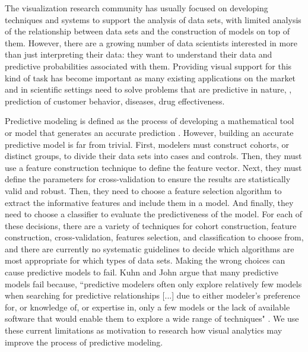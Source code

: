 The visualization research community has usually focused on developing techniques and systems to support the analysis of data sets, with limited analysis of the relationship between data sets and the construction of models on top of them. However, there are a growing number of data scientists interested in more than just interpreting their data: they want to understand their data and predictive probabilities associated with them. Providing visual support for this kind of task has become important as many existing applications on the market and in scientific settings need to solve problems that are predictive in nature, \eg, prediction of customer behavior, diseases, drug effectiveness.

Predictive modeling is defined as the process of developing a mathematical tool or model that generates an accurate prediction \cite{kuhn2013applied}. However, building an accurate predictive model is far from trivial. First, modelers must construct cohorts, or distinct groups, to divide their data sets into cases and controls. Then, they must use a feature construction technique to define the feature vector. Next, they must define the parameters for cross-validation to ensure the results are statistically valid and robust. Then, they need to choose a feature selection algorithm to extract the informative features and include them in a model. And finally, they need to choose a classifier to evaluate the predictiveness of the model. For each of these decisions, there are a variety of techniques for cohort construction, feature construction, cross-validation, features selection, and classification to choose from, and there are currently no systematic guidelines to decide which algorithms are most appropriate for which types of data sets. Making the wrong choices can cause predictive models to fail. Kuhn and John argue that many predictive models fail because, ``predictive modelers often only explore relatively few models when searching for predictive relationships [...] due to either modeler's preference for, or knowledge of, or expertise in, only a few models or the lack of available software that would enable them to explore a wide range of techniques" \cite{kuhn2013applied}. We use these current limitations as motivation to research how visual analytics may improve the process of predictive modeling.

